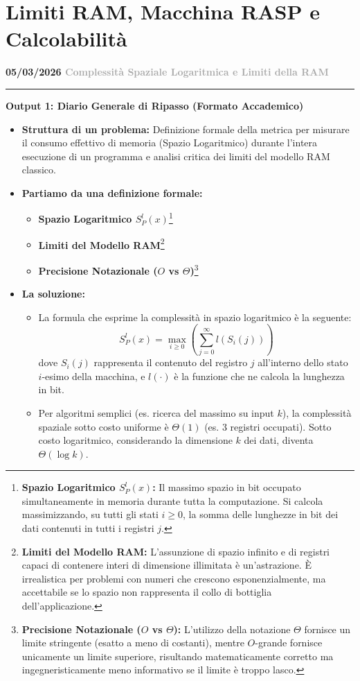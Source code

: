 \documentclass[a4paper, 11pt]{report}
\newcommand{\lezione}[2]{
\vspace{2em}
\noindent\textbf{\Large #1 \hfill \textcolor{darkgray}{#2}}
\vspace{0.5em}
\hrule
\vspace{1.5em}
}
\newcommand{\definizione}[2]{%
\textbf{#1}\footnote{\textbf{#1:} #2}%
}
\begin{document}
\chapter{Limiti RAM, Macchina RASP e Calcolabilità}

\lezione{05/03/2026}{Complessità Spaziale Logaritmica e Limiti della RAM}
\vspace{0.5cm}
\textbf{Output 1: Diario Generale di Ripasso (Formato Accademico)}
\begin{itemize}
\item \textbf{Struttura di un problema:}
Definizione formale della metrica per misurare il consumo effettivo di memoria (Spazio Logaritmico) durante l'intera esecuzione di un programma e analisi critica dei limiti del modello RAM classico.

\item \textbf{Partiamo da una definizione formale:}
\begin{itemize}
    \item \definizione{Spazio Logaritmico $S^l_P(x)$}{Il massimo spazio in bit occupato simultaneamente in memoria durante tutta la computazione. Si calcola massimizzando, su tutti gli stati $i \ge 0$, la somma delle lunghezze in bit dei dati contenuti in tutti i registri $j$.}
    \item \definizione{Limiti del Modello RAM}{L'assunzione di spazio infinito e di registri capaci di contenere interi di dimensione illimitata è un'astrazione. È irrealistica per problemi con numeri che crescono esponenzialmente, ma accettabile se lo spazio non rappresenta il collo di bottiglia dell'applicazione.}
    \item \definizione{Precisione Notazionale ($O$ vs $\Theta$)}{L'utilizzo della notazione $\Theta$ fornisce un limite stringente (esatto a meno di costanti), mentre $O$-grande fornisce unicamente un limite superiore, risultando matematicamente corretto ma ingegneristicamente meno informativo se il limite è troppo lasco.}
\end{itemize}

\item \textbf{La soluzione:}
\begin{itemize}
    \item La formula che esprime la complessità in spazio logaritmico è la seguente:
    \[ S^l_P(x) = \max_{i \ge 0} \left( \sum_{j=0}^{\infty} l(S_i(j)) \right) \]
    dove $S_i(j)$ rappresenta il contenuto del registro $j$ all'interno dello stato $i$-esimo della macchina, e $l(\cdot)$ è la funzione che ne calcola la lunghezza in bit.
    \item Per algoritmi semplici (es. ricerca del massimo su input $k$), la complessità spaziale sotto costo uniforme è $\Theta(1)$ (es. 3 registri occupati). Sotto costo logaritmico, considerando la dimensione $k$ dei dati, diventa $\Theta(\log k)$.
\end{itemize}
\end{itemize}
\end{document}
